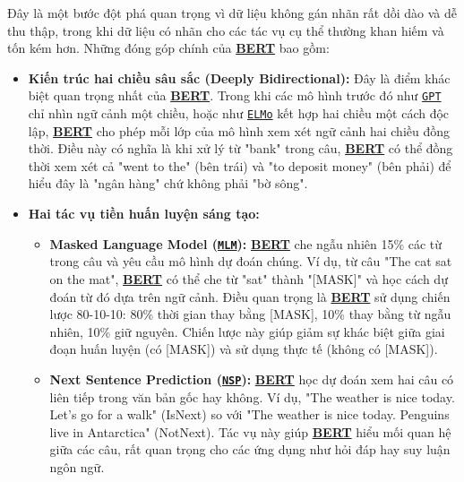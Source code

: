 Đây là một bước đột phá quan trọng vì dữ liệu không gán nhãn rất dồi dào và dễ thu thập, trong khi dữ liệu có nhãn cho các tác vụ cụ thể thường khan hiếm và tốn kém hơn.
Những đóng góp chính của \hyperref[acro:bert]{\textbf{BERT}} bao gồm:
\begin{itemize}
    \item \textbf{Kiến trúc hai chiều sâu sắc (Deeply Bidirectional):} Đây là điểm khác biệt quan trọng nhất của \hyperref[acro:bert]{\textbf{BERT}}.
    Trong khi các mô hình trước đó như \hyperref[acro:gpt]{\texttt{GPT}} chỉ nhìn ngữ cảnh một chiều, hoặc như \hyperref[acro:elmo]{\texttt{ELMo}} kết hợp hai chiều một cách độc lập, \hyperref[acro:bert]{\textbf{BERT}} cho phép mỗi lớp của mô hình xem xét ngữ cảnh hai chiều đồng thời.
    Điều này có nghĩa là khi xử lý từ "bank" trong câu, \hyperref[acro:bert]{\textbf{BERT}} có thể đồng thời xem xét cả "went to the" (bên trái) và "to deposit money" (bên phải) để hiểu đây là "ngân hàng" chứ không phải "bờ sông".
    \item \textbf{Hai tác vụ tiền huấn luyện sáng tạo:}
    \begin{itemize}
        \item \textbf{Masked Language Model (\hyperref[acro:mlm]{\texttt{MLM}}):} \hyperref[acro:bert]{\textbf{BERT}} che ngẫu nhiên 15\% các từ trong câu và yêu cầu mô hình dự đoán chúng.
        Ví dụ, từ câu "The cat sat on the mat", \hyperref[acro:bert]{\textbf{BERT}} có thể che từ "sat" thành "[MASK]" và học cách dự đoán từ đó dựa trên ngữ cảnh.
        Điều quan trọng là \hyperref[acro:bert]{\textbf{BERT}} sử dụng chiến lược 80-10-10: 80\% thời gian thay bằng [MASK], 10\% thay bằng từ ngẫu nhiên, 10\% giữ nguyên.
        Chiến lược này giúp giảm sự khác biệt giữa giai đoạn huấn luyện (có [MASK]) và sử dụng thực tế (không có [MASK]).
        \item \textbf{Next Sentence Prediction (\hyperref[acro:nsp]{\texttt{NSP}}):} \hyperref[acro:bert]{\textbf{BERT}} học dự đoán xem hai câu có liên tiếp trong văn bản gốc hay không.
        Ví dụ, "The weather is nice today. Let's go for a walk" (IsNext) so với "The weather is nice today. Penguins live in Antarctica" (NotNext).
        Tác vụ này giúp \hyperref[acro:bert]{\textbf{BERT}} hiểu mối quan hệ giữa các câu, rất quan trọng cho các ứng dụng như hỏi đáp hay suy luận ngôn ngữ.
    \end{itemize}
    

\end{itemize}
